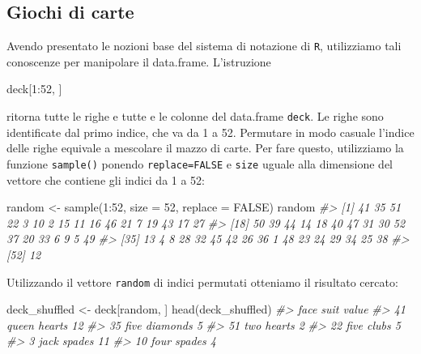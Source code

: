 \documentclass[
  11pt,
]{krantz}
\makeatletter
\newenvironment{Shaded}{\begin{snugshade}}{\end{snugshade}}
\newcommand{\AttributeTok}[1]{\textcolor[rgb]{0.61,0.61,0.61}{#1}}
\newcommand{\CommentTok}[1]{\textcolor[rgb]{0.37,0.37,0.37}{\textit{#1}}}
\newcommand{\ConstantTok}[1]{\textcolor[rgb]{0,0,0}{#1}}
\newcommand{\DecValTok}[1]{\textcolor[rgb]{0.06,0.06,0.06}{#1}}
\newcommand{\FunctionTok}[1]{\textcolor[rgb]{0,0,0}{#1}}
\newcommand{\NormalTok}[1]{#1}
\newcommand{\OtherTok}[1]{\textcolor[rgb]{0.37,0.37,0.37}{#1}}
\newcommand{\SpecialCharTok}[1]{\textcolor[rgb]{0,0,0}{#1}}
\newenvironment{kframe}{%
\medskip{}
\setlength{\fboxsep}{.8em}
 \def\at@end@of@kframe{}%
 \ifinner\ifhmode%
  \def\at@end@of@kframe{\end{minipage}}%
  \begin{minipage}{\columnwidth}%
 \fi\fi%
 \def\FrameCommand##1{\hskip\@totalleftmargin \hskip-\fboxsep
 \colorbox{shadecolor}{##1}\hskip-\fboxsep
     \hskip-\linewidth \hskip-\@totalleftmargin \hskip\columnwidth}%
 \MakeFramed {\advance\hsize-\width
   \@totalleftmargin\z@ \linewidth\hsize
   \@setminipage}}%
 {\par\unskip\endMakeFramed%
 \at@end@of@kframe}
\renewenvironment{Shaded}{\begin{kframe}}{\end{kframe}}
\theoremstyle{definition}
\theoremstyle{definition}
\theoremstyle{definition}
\theoremstyle{definition}
\theoremstyle{remark}
\makeatother
\begin{document}
\hypertarget{giochi-di-carte}{%
\subsection{Giochi di carte}\label{giochi-di-carte}}

Avendo presentato le nozioni base del sistema di notazione di \texttt{R}, utilizziamo tali conoscenze per manipolare il data.frame. L'istruzione

\begin{Shaded}
\begin{Highlighting}[]
\NormalTok{deck[}\DecValTok{1}\SpecialCharTok{:}\DecValTok{52}\NormalTok{, ]}
\end{Highlighting}
\end{Shaded}

ritorna tutte le righe e tutte e le colonne del data.frame \texttt{deck}. Le righe sono identificate dal primo indice, che va da 1 a 52. Permutare in modo casuale l'indice delle righe equivale a mescolare il mazzo di carte. Per fare questo, utilizziamo la funzione \texttt{sample()} ponendo \texttt{replace=FALSE} e \texttt{size} uguale alla dimensione del vettore che contiene gli indici da 1 a 52:

\begin{Shaded}
\begin{Highlighting}[]
\NormalTok{random }\OtherTok{\textless{}{-}} \FunctionTok{sample}\NormalTok{(}\DecValTok{1}\SpecialCharTok{:}\DecValTok{52}\NormalTok{, }\AttributeTok{size =} \DecValTok{52}\NormalTok{, }\AttributeTok{replace =} \ConstantTok{FALSE}\NormalTok{)}
\NormalTok{random}
\CommentTok{\#\textgreater{}  [1] 41 35 51 22  3 10  2 15 11 16 46 21  7 19 43 17 27}
\CommentTok{\#\textgreater{} [18] 50 39 44 14 18 40 47 31 30 52 37 20 33  6  9  5 49}
\CommentTok{\#\textgreater{} [35] 13  4  8 28 32 45 42 26 36  1 48 23 24 29 34 25 38}
\CommentTok{\#\textgreater{} [52] 12}
\end{Highlighting}
\end{Shaded}

Utilizzando il vettore \texttt{random} di indici permutati otteniamo il risultato cercato:

\begin{Shaded}
\begin{Highlighting}[]
\NormalTok{deck\_shuffled }\OtherTok{\textless{}{-}}\NormalTok{ deck[random, ]}
\FunctionTok{head}\NormalTok{(deck\_shuffled)}
\CommentTok{\#\textgreater{}     face     suit value}
\CommentTok{\#\textgreater{} 41 queen   hearts    12}
\CommentTok{\#\textgreater{} 35  five diamonds     5}
\CommentTok{\#\textgreater{} 51   two   hearts     2}
\CommentTok{\#\textgreater{} 22  five    clubs     5}
\CommentTok{\#\textgreater{} 3   jack   spades    11}
\CommentTok{\#\textgreater{} 10  four   spades     4}
\end{Highlighting}
\end{Shaded}
\end{document}
